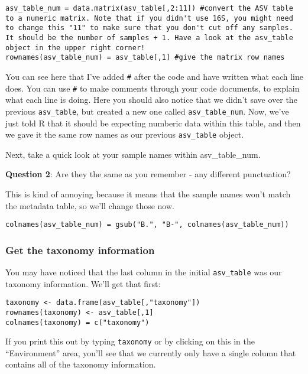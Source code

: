 \documentclass[
]{book}
\begin{document}
\begin{verbatim}
asv_table_num = data.matrix(asv_table[,2:11]) #convert the ASV table to a numeric matrix. Note that if you didn't use 16S, you might need to change this "11" to make sure that you don't cut off any samples. It should be the number of samples + 1. Have a look at the asv_table object in the upper right corner!
rownames(asv_table_num) = asv_table[,1] #give the matrix row names
\end{verbatim}

You can see here that I've added \texttt{\#} after the code and have written what each line does. You can use \texttt{\#} to make comments through your code documents, to explain what each line is doing. Here you should also notice that we didn't save over the previous \texttt{asv\_table}, but created a new one called \texttt{asv\_table\_num}. Now, we've just told R that it should be expecting numberic data within this table, and then we gave it the same row names as our previous \texttt{asv\_table} object.

Next, take a quick look at your sample names within asv\_table\_num.

\textbf{Question 2}: Are they the same as you remember - any different punctuation?

This is kind of annoying because it means that the sample names won't match the metadata table, so we'll change those now.

\begin{verbatim}
colnames(asv_table_num) = gsub("B.", "B-", colnames(asv_table_num))
\end{verbatim}

\subsubsection{Get the taxonomy information}\label{get-the-taxonomy-information}

You may have noticed that the last column in the initial \texttt{asv\_table} was our taxonomy information. We'll get that first:

\begin{verbatim}
taxonomy <- data.frame(asv_table[,"taxonomy"])
rownames(taxonomy) <- asv_table[,1]
colnames(taxonomy) = c("taxonomy")
\end{verbatim}

If you print this out by typing \texttt{taxonomy} or by clicking on this in the ``Environment'' area, you'll see that we currently only have a single column that contains all of the taxonomy information.
\end{document}
